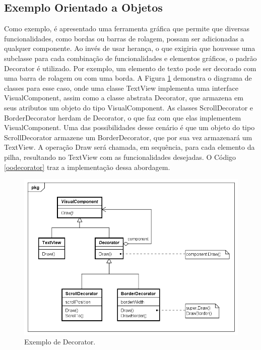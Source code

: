 \subsection*{Exemplo Orientado a Objetos}

Como exemplo, é apresentado uma ferramenta  
gráfica que permite que diversas funcionalidades, 
como bordas ou barras de rolagem, possam ser adicionadas 
a qualquer componente. Ao invés de usar herança, 
o que exigiria que houvesse uma subclasse para cada 
combinação de funcionalidades e elementos gráficos, 
o padrão Decorator é utilizado. Por exemplo, um 
elemento de texto pode ser decorado com uma barra 
de rolagem ou com uma borda. A Figura \ref{decorator_exemplo} 
demonstra o diagrama de classes para esse caso, 
onde uma classe TextView implementa uma interface 
VisualComponent, assim como a classe abstrata Decorator, 
que armazena em seus atributos um objeto do tipo 
VisualComponent. As classes ScrollDecorator e 
BorderDecorator herdam de Decorator, o que faz com que 
elas implementem VisualComponent. Uma das 
possibilidades desse cenário é que um objeto do tipo 
ScrollDecorator armazene um BorderDecorator, que 
por sua vez armazenará um TextView. A operação 
Draw será chamada, em sequência, para cada 
elemento da pilha, resultando no TextView 
com as funcionalidades desejadas. O Código 
\ref{oodecorator} traz a implementação dessa 
abordagem.

\begin{figure}[htb]
	\caption{\label{decorator_exemplo}Exemplo de Decorator.}
	\begin{center}
	    \includegraphics[scale=0.5]{5_padroes-contexto-funcional/5.2_estruturais/5.2.4_decorator/decorator_exemplo.png}
	\end{center}
\end{figure}

